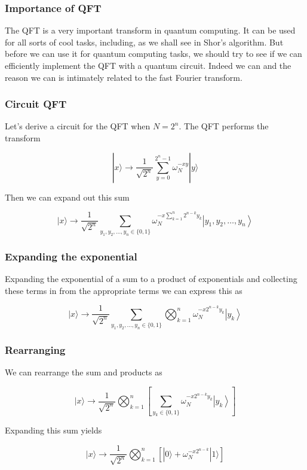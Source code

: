 \documentclass{beamer}
\begin{document}
\begin{frame}
\frametitle{Importance of QFT}

The QFT is a very important transform in quantum computing. It can be
used for all sorts of cool tasks, including, as we shall see in Shor's
algorithm. But before we can use it for quantum computing tasks, we
should try to see if we can efficiently implement the QFT with a
quantum circuit. Indeed we can and the reason we can is intimately
related to the fast Fourier transform.
\end{frame}

\begin{frame}
\frametitle{Circuit QFT}

Let's derive a circuit for the QFT when $N=2^{n}$. The QFT performs the transform

\begin{equation*}
|x\rangle \rightarrow \frac{1}{\sqrt{2^{n}}} \sum_{y=0}^{2^{n}-1} \omega_{N}^{-x y}|y\rangle 
\end{equation*}

Then we can expand out this sum

\begin{equation*}
|x\rangle \rightarrow \frac{1}{\sqrt{2^{n}}} \sum_{y_{1}, y_{2}, \ldots, y_{n} \in\{0,1\}} \omega_{N}^{-x \sum_{k=1}^{n} 2^{n-k} y_{k}}\left|y_{1}, y_{2}, \ldots, y_{n}\right\rangle 
\end{equation*}
\end{frame}

\begin{frame}
\frametitle{Expanding the exponential}

Expanding the exponential of a sum to a product of exponentials and
collecting these terms in from the appropriate terms we can express
this as

\begin{equation*}
|x\rangle \rightarrow \frac{1}{\sqrt{2^{n}}} \sum_{y_{1}, y_{2}, \ldots, y_{n} \in\{0,1\}} \bigotimes_{k=1}^{n} \omega_{N}^{-x 2^{n-k} y_{k}}\left|y_{k}\right\rangle 
\end{equation*}
\end{frame}

\begin{frame}
\frametitle{Rearranging}

We can rearrange the sum and products as

\begin{equation*}
|x\rangle \rightarrow \frac{1}{\sqrt{2^{n}}} \bigotimes_{k=1}^{n}\left[\sum_{y_{k} \in\{0,1\}} \omega_{N}^{-x 2^{n-k} y_{k}}\left|y_{k}\right\rangle\right] 
\end{equation*}

Expanding this sum yields

\begin{equation*}
|x\rangle \rightarrow \frac{1}{\sqrt{2^{n}}} \bigotimes_{k=1}^{n}\left[|0\rangle+\omega_{N}^{-x 2^{n-k}}|1\rangle\right]
\end{equation*}
\end{frame}
\end{document}
